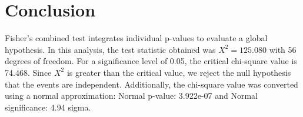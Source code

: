 \documentclass[12pt]{article}
\begin{document}
\section*{Conclusion}
Fisher's combined test integrates individual p-values to evaluate a global hypothesis. 
In this analysis, the test statistic obtained was $X^2 = 125.080$ with 56 degrees of freedom. 
For a significance level of 0.05, the critical chi-square value is 74.468. 
Since $X^2$ is greater than the critical value, 
we reject the null hypothesis that the events are independent.
\newline
Additionally, the chi-square value was converted using a normal approximation:
\newline
Normal p-value: 3.922e-07 and Normal significance: 4.94 sigma.
\end{document}
